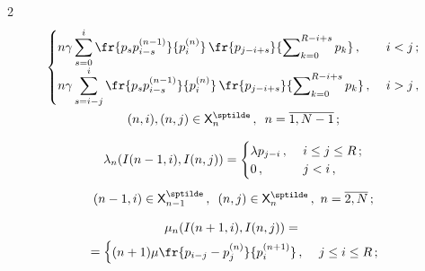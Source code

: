\begin{multicols}{2}
\begin{multline}
\begin{cases}
  \displaystyle n\gamma\sum\limits_{s=0}^i \fr{p_sp_{i-s}^{(n-

1)}}{p_i^{(n)}}\,\fr{p_{j-i+s}}{\sum\nolimits_{k=0}^{R-i+s}p_k}\,, &\ i<j\,;\\[5pt]

  \displaystyle n\gamma\sum\limits^i_{s=i-j} \fr{p_s p_{i-s}^{(n-1)}} 

{p_i^{(n)}}\, \fr{p_{j-i+s}}{\sum\nolimits_{k=0}^{R-i+s} p_k}\,, &\ i>j\,,

  \end{cases}\\

     (n,i), (n,j)\in {\sf X}_n^{\sptilde}\,,\enskip 

  n=\overline{1,N-1}\,;

  \label{e1-sop}

  \end{multline}

  

  \vspace*{-12pt}

  

\noindent

  \begin{multline}

  \lambda_n(I(n-1,i),I(n,j))=\begin{cases}

  \lambda p_{j-i}\,, &\ i\leq j\leq R\,;\\

  0\,, &\ j<i\,,\end{cases}\\[5pt]

  (n-1,i)\in {\sf X}_{n-1}^{\sptilde}\,,\enskip

  (n,j)\in {\sf X}^{\sptilde}_n\,,\ n=\overline{2,N}\,;

  \label{e2-sop}

  \end{multline}

  

  \vspace*{-12pt}

  

  \noindent

  \begin{multline}

  \mu_n(I(n+1,i), I(n,j))={}\\

  {}=\begin{cases}

  \displaystyle (n+1)\mu \fr{p_{i-j}-p_j^{(n)}}{p_i^{(n+1)}}\,, &\ j\leq i\leq R\,;\\


\end{cases}
\end{multline}
\end{multicols}
